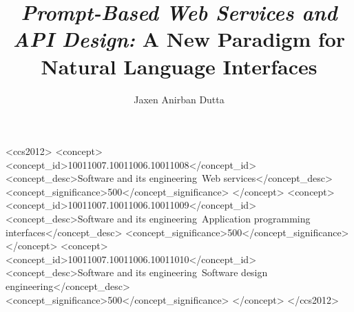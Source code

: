 \documentclass[sigplan,screen]{acmart}
\begin{document}
\title{\textit{Prompt-Based Web Services and API Design:} A New Paradigm for Natural Language Interfaces}

\author{Jaxen Anirban Dutta}

\renewcommand{\shortauthors}{Dutta}



\begin{CCSXML}
<ccs2012>
 <concept>
  <concept_id>10011007.10011006.10011008</concept_id>
  <concept_desc>Software and its engineering~Web services</concept_desc>
  <concept_significance>500</concept_significance>
 </concept>
 <concept>
  <concept_id>10011007.10011006.10011009</concept_id>
  <concept_desc>Software and its engineering~Application programming interfaces</concept_desc>
  <concept_significance>500</concept_significance>
 </concept>
 <concept>
  <concept_id>10011007.10011006.10011010</concept_id>
  <concept_desc>Software and its engineering~Software design engineering</concept_desc>
  <concept_significance>500</concept_significance>
 </concept>
</ccs2012>
\end{CCSXML}


\end{document}
